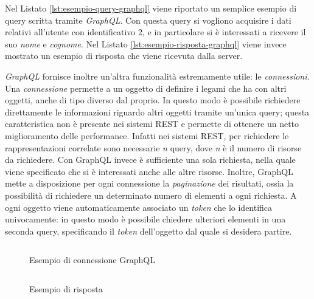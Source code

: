 Nel Listato \ref{lst:esempio-query-graphql} viene riportato un semplice esempio di query scritta tramite \emph{GraphQL}. Con questa query si vogliono acquisire i dati relativi all'utente con identificativo 2, e in particolare si è interessati a ricevere il suo \emph{nome} e \emph{cognome}. Nel Listato \ref{lst:esempio-risposta-graphql} viene invece mostrato un esempio di risposta che viene ricevuta dalla server.

\emph{GraphQL} fornisce inoltre un'altra funzionalità estremamente utile: le \emph{connessioni}. Una \emph{connessione} permette a un oggetto di definire i legami che ha con altri oggetti, anche di tipo diverso dal proprio. In questo modo è possibile richiedere direttamente le informazioni riguardo altri oggetti tramite un'unica query; questa caratteristica non è presente nei sistemi REST e permette di ottenere un netto miglioramento delle performance. Infatti nei sistemi REST, per richiedere le rappresentazioni correlate sono necessarie \emph{n} query, dove \emph{n} è il numero di risorse da richiedere. Con GraphQL invece è sufficiente una sola richiesta, nella quale viene specificato che si è interessati anche alle altre risorse. Inoltre, GraphQL mette a disposizione per ogni connessione la \emph{paginazione} dei risultati, ossia la possibilità di richiedere un determinato numero di elementi a ogni richiesta. A ogni oggetto viene automaticamente associato un \emph{token} che lo identifica univocamente: in questo modo è possibile chiedere ulteriori elementi in una seconda query, specificando il \emph{token} dell'oggetto dal quale si desidera partire.

\begin{figure}[ht]
	\hspace*{-1.5cm}
	\begin{minipage}[t]{0.58\textwidth}
		\begin{listing}[H]
			\inputminted{text}{2-nozioni-preliminari/Codice/esempio_connessione_graphql.graphql}
			\caption{Esempio di connessione GraphQL}
			\label{lst:esempio-connessione-graphql}
		\end{listing}
	\end{minipage}%
	\hspace{2mm}%
	\begin{minipage}[t]{0.58\textwidth}
		\begin{listing}[H]
			\inputminted{json}{2-nozioni-preliminari/Codice/esempio_risposta_connessione_graphql.json}
			\caption{Esempio di risposta}
			\label{lst:esempio-risposta-connessione-graphql}
		\end{listing}
	\end{minipage}	
\end{figure}

